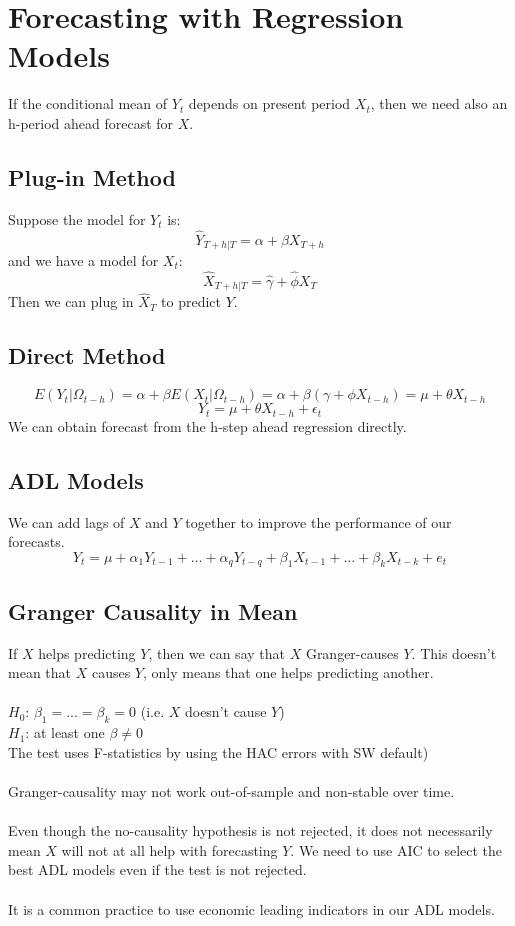 \documentclass{article}
\begin{document}
\section{Forecasting with Regression Models}
If the conditional mean of $Y_t$ depends on present period $X_t$, then we need also an h-period ahead forecast for $X$. 

\subsection{Plug-in Method}
Suppose the model for $Y_t$ is:
$$\hat{Y}_{T+h|T} = \alpha + \beta X_{T+h}$$
and we have a model for $X_t$:
$$\hat{X}_{T+h|T} = \hat{\gamma} + \hat{\phi}X_T$$
Then we can plug in $\hat{X}_T$ to predict $Y$.

\subsection{Direct Method}
$$E(Y_t|\Omega_{t-h}) = \alpha + \beta E(X_t|\Omega_{t-h}) = \alpha + \beta (\gamma + \phi X_{t-h}) = \mu + \theta X_{t-h}$$
$$Y_t = \mu + \theta X_{t-h} + \epsilon_t$$
We can obtain forecast from the h-step ahead regression directly.

\subsection{ADL Models}
We can add lags of $X$ and $Y$ together to improve the performance of our forecasts.
$$Y_t = \mu + \alpha_1 Y_{t-1} + ... + \alpha_q Y_{t-q} + \beta_1 X_{t-1} + ... + \beta_k X_{t-k} + e_t$$

\subsection{Granger Causality in Mean}
If $X$ helps predicting $Y$, then we can say that $X$ Granger-causes $Y$. This doesn't mean that $X$ causes $Y$, only means that one helps predicting another.\\
\\
$H_0$: $\beta_1 = ... = \beta_k = 0$ (i.e. $X$ doesn't cause $Y$)\\
$H_1$: at least one $\beta \neq 0$\\
The test uses F-statistics by using the HAC errors with SW default)\\
\\
Granger-causality may not work out-of-sample and non-stable over time.\\
\\
Even though the no-causality hypothesis is not rejected, it does not necessarily mean $X$ will not at all help with forecasting $Y$. We need to use AIC to select the best ADL models even if the test is not rejected.\\
\\
It is a common practice to use economic leading indicators in our ADL models.
\end{document}
